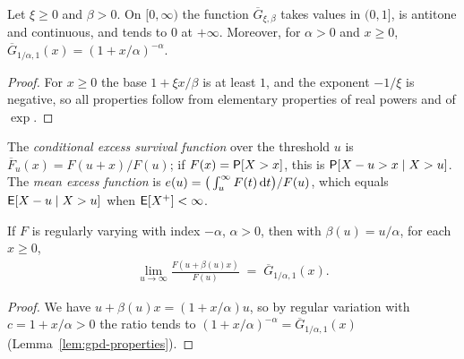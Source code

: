 \begin{lemma}
  \label{lem:gpd-properties}
  \leanok
  Let $\xi \ge 0$ and $\beta > 0$. On $[0, \infty)$ the function $\overline{G}_{\xi,\beta}$ takes
  values in $(0, 1]$, is antitone and continuous, and tends to $0$ at $+\infty$. Moreover, for
  $\alpha > 0$ and $x \ge 0$, $\overline{G}_{1/\alpha, 1}(x) = (1 + x/\alpha)^{-\alpha}$.
\end{lemma}
\begin{proof}
  \leanok
  For $x \ge 0$ the base $1 + \xi x / \beta$ is at least $1$, and the exponent $-1/\xi$ is negative,
  so all properties follow from elementary properties of real powers and of $\exp$.
\end{proof}

\begin{definition}
  \label{def:excess-survival}
  \leanok
  The \emph{conditional excess survival function} over the threshold $u$ is
  $\overline{F}_u(x) = F(u + x)/F(u)$; if $F(x) = \mathsf{P}[X > x]$, this is $\mathsf{P}[X - u > x \mid X > u]$.
  The \emph{mean excess function} is $e(u) = \big( \int_u^\infty F(t) \, \mathrm{d} t \big) / F(u)$, which
  equals $\mathsf{E}[X - u \mid X > u]$ when $\mathsf{E}[X^+] < \infty$.
\end{definition}

\begin{lemma}
  \label{lem:pot-pointwise}
  \leanok
  If $F$ is regularly varying with index $-\alpha$, $\alpha > 0$, then with
  $\beta(u) = u/\alpha$, for each $x \ge 0$,
  \begin{align*}
    \lim_{u \to \infty} \frac{F(u + \beta(u) x)}{F(u)} \; = \; \overline{G}_{1/\alpha, 1}(x) .
  \end{align*}
\end{lemma}
\begin{proof}
  \leanok
  We have $u + \beta(u) x = (1 + x/\alpha) u$, so by regular variation with $c = 1 + x/\alpha > 0$
  the ratio tends to $(1 + x/\alpha)^{-\alpha} = \overline{G}_{1/\alpha,1}(x)$
  (Lemma~\ref{lem:gpd-properties}).
\end{proof}

